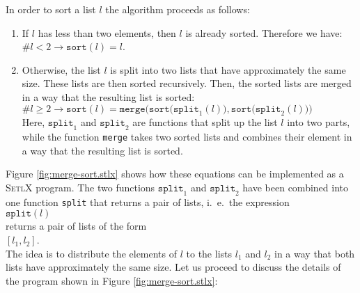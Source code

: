 In order to sort a list $l$ the algorithm proceeds as follows:
\begin{enumerate}
\item If $l$ has less than two elements, then $l$ is already sorted.  Therefore we have: 
      \\[0.2cm]
      \hspace*{1.3cm}
      $\#l < 2 \rightarrow \mathtt{sort}(l) = l$.
\item Otherwise, the list $l$ is split into two lists that have approximately the same size.
      These lists are then sorted recursively.  Then, the sorted lists are merged in a way that the
      resulting list is sorted: \\[0.2cm]
      \hspace*{1.3cm} 
      $\#l \geq 2 \rightarrow \mathtt{sort}(l) = \mathtt{merge}\bigl(\mathtt{sort}\bigl(\mathtt{split}_1(l)\bigr), \mathtt{sort}\bigl(\mathtt{split}_2(l)\bigr)\bigr)$
     \\[0.2cm]
     Here, $\texttt{split}_1$ and $\mathtt{split}_2$ are functions that split up the list $l$ into
     two parts, while the function \texttt{merge} takes two sorted lists and combines their element
     in a way that the resulting list is sorted.
\end{enumerate}
Figure \ref{fig:merge-sort.stlx} shows how these equations can be implemented as a \textsc{SetlX}
program.  The two functions $\mathtt{split}_1$ and $\mathtt{split}_2$ have been combined into one
function \texttt{split} that returns a pair of lists, i.~e.~the expression
\\[0.2cm]
\hspace*{1.3cm}
$\mathtt{split}(l)$
\\[0.2cm]
returns a pair of lists of the form
\\[0.2cm]
\hspace*{1.3cm}
$[l_1, l_2]$.
\\[0.2cm]
The idea is to distribute the elements of $l$ to the lists $l_1$ and $l_2$ in a way that both lists
have approximately the same size.   Let us proceed to discuss the details of the program shown in
Figure \ref{fig:merge-sort.stlx}:


